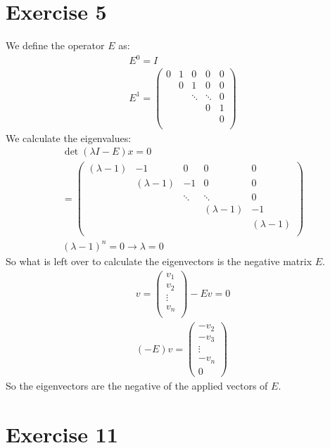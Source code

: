 \section{Exercise 5}
We define the operator $E$ as:
\begin{gather*}
E^0 = I \\
E^1 = \left( \begin{array}{ccccc}
0&1 & 0 &0 &0 \\
& 0 &1 &0 &0 \\
& & \ddots & \ddots &0 \\
& & & 0 & 1 \\
& & & & 0 \\
\end{array} \right)
\end{gather*}
We calculate the eigenvalues:
\begin{gather*}
\det ( \lambda I - E ) x = 0\\
= \left( \begin{array}{ccccc}
(\lambda -1)&-1 & 0 &0 &0 \\
& (\lambda -1) & -1 &0 &0 \\
& & \ddots & \ddots &0 \\
& & & (\lambda -1) & -1 \\
& & & & (\lambda -1) \\
\end{array} \right) \\
(\lambda -1) ^n = 0 \rightarrow \lambda = 0
\end{gather*}
So what is left over to calculate the eigenvectors is the negative matrix $E$.
\begin{gather*}
v = \left( \begin{array}{c}
v_1\\
v_2\\ 
\vdots \\
v_n\\
\end{array} \right)
-E v = 0\\
(-E)v = \left( \begin{array}{c}
-v_2 \\
-v_3\\
\vdots \\
-v_n \\
0
\end{array}\right)
\end{gather*}
So the eigenvectors are the negative of the applied vectors of $E$.
\section{Exercise 11}
